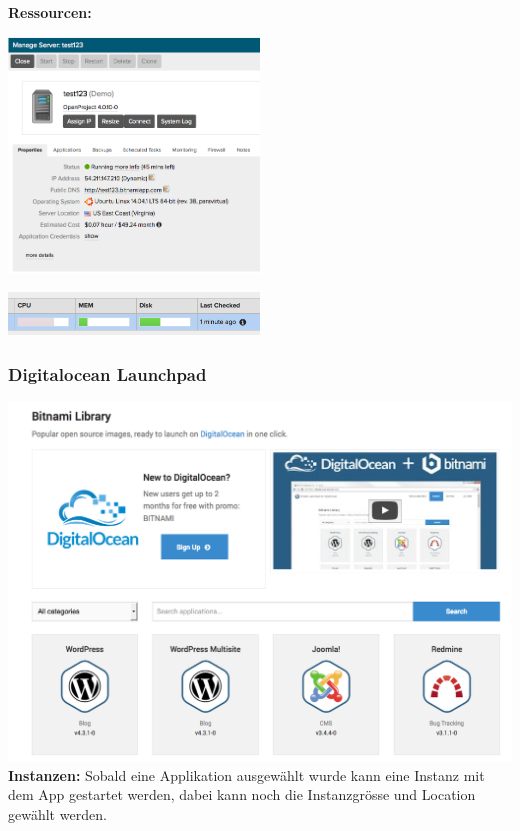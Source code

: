\textbf{Ressourcen:}

\includegraphics[width=0.5\textwidth]{./03_Analyse/03_Bitnami/images/aws_managment}

\includegraphics[width=0.5\textwidth]{./03_Analyse/03_Bitnami/images/aws_resrouces}

\newpage
\subsubsection{Digitalocean Launchpad}
\includegraphics[width=\textwidth]{./03_Analyse/03_Bitnami/images/digitalocean_launchpad}
\textbf{Instanzen:}
Sobald eine Applikation ausgewählt wurde kann eine Instanz mit dem App gestartet 
werden, dabei kann noch die Instanzgrösse und Location gewählt werden.

